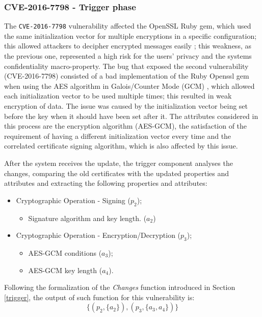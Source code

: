 \subsubsection{CVE-2016-7798 - Trigger phase}
The \texttt{CVE-2016-7798} vulnerability affected the OpenSSL Ruby gem, which used the same initialization vector for multiple encryptions in a specific configuration; this allowed attackers to decipher encrypted messages easily \cite{vector}; this weakness, as the previous one, represented a high risk for the users' privacy and the systems confidentiality macro-property.
The bug that exposed the second vulnerability (CVE-2016-7798) consisted of a bad implementation of the Ruby Openssl gem when using the AES algorithm in Galois/Counter Mode (GCM) \cite{gcm}, which allowed each initialization vector to be used multiple times; this resulted in weak encryption of data. The issue was caused by the initialization vector being set before the key when it should have been set after it. The attributes considered in this process are the encryption algorithm (AES-GCM), the satisfaction of the requirement of having a different initialization vector every time and the correlated certificate signing algorithm, which is also affected by this issue.



After the system receives the update, the trigger component analyses the changes, comparing the old certificates with the updated properties and attributes and extracting the following properties and attributes:

\begin{itemize}
    \item Cryptographic Operation - Signing (\(p_2\));
    \begin{itemize}
        \item Signature algorithm and key length. (\(a_2\))
    \end{itemize}
    \item Cryptographic Operation - Encryption/Decryption (\(p_3\));
    \begin{itemize}
        \item AES-GCM conditions (\(a_3\));
        \item AES-GCM key length (\(a_4\)).
    \end{itemize}
\end{itemize}

Following the formalization of the \textit{Changes} function introduced in Section \ref{trigger}, the output of such function for this vulnerability is: \[ \{(p_2, \{a_2\}), (p_3, \{a_3, a_4\}) \}\]

